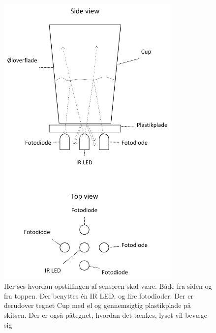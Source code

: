 \documentclass[Rapport/Rapport_main.tex]{subfiles}
\begin{document}
\begin{figure}[H]
    \centering
    \includegraphics[width=0.8\textwidth]{HardwareDesign/CupSensor/graphics/lightPath.png}
    \caption{Her ses hvordan opstillingen af sensoren skal være. Både fra siden og fra toppen. Der benyttes én IR LED, og fire fotodioder. Der er derudover tegnet Cup med øl og gennemsigtig plastikplade på skitsen. Der er også påtegnet, hvordan det tænkes, lyset vil bevæge sig}
    \label{fig:lightPaht}
\end{figure}
\end{document}

